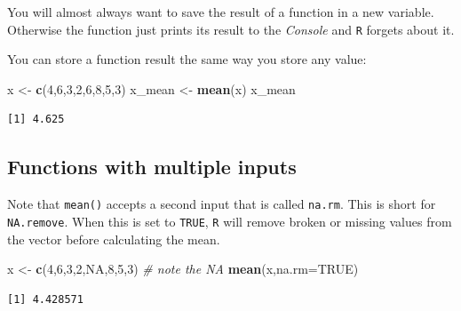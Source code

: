 \documentclass[
]{book}
\newenvironment{Shaded}{\begin{snugshade}}{\end{snugshade}}
\newcommand{\CommentTok}[1]{\textcolor[rgb]{0.56,0.35,0.01}{\textit{#1}}}
\newcommand{\DataTypeTok}[1]{\textcolor[rgb]{0.13,0.29,0.53}{#1}}
\newcommand{\DecValTok}[1]{\textcolor[rgb]{0.00,0.00,0.81}{#1}}
\newcommand{\KeywordTok}[1]{\textcolor[rgb]{0.13,0.29,0.53}{\textbf{#1}}}
\newcommand{\NormalTok}[1]{#1}
\newcommand{\OtherTok}[1]{\textcolor[rgb]{0.56,0.35,0.01}{#1}}
\newcommand{\StringTok}[1]{\textcolor[rgb]{0.31,0.60,0.02}{#1}}
\begin{document}
You will almost always want to save the result of a function in a new variable. Otherwise the function just prints its result to the \emph{Console} and \texttt{R} forgets about it.

You can store a function result the same way you store any value:

\begin{Shaded}
\begin{Highlighting}[]
\NormalTok{x <-}\StringTok{ }\KeywordTok{c}\NormalTok{(}\DecValTok{4}\NormalTok{,}\DecValTok{6}\NormalTok{,}\DecValTok{3}\NormalTok{,}\DecValTok{2}\NormalTok{,}\DecValTok{6}\NormalTok{,}\DecValTok{8}\NormalTok{,}\DecValTok{5}\NormalTok{,}\DecValTok{3}\NormalTok{) }
\NormalTok{x_mean <-}\StringTok{ }\KeywordTok{mean}\NormalTok{(x) }
\NormalTok{x_mean}
\end{Highlighting}
\end{Shaded}

\begin{verbatim}
[1] 4.625
\end{verbatim}

\hypertarget{functions-with-multiple-inputs}{%
\subsection*{Functions with multiple inputs}\label{functions-with-multiple-inputs}}

Note that \texttt{mean()} accepts a second input that is called \texttt{na.rm}. This is short for \texttt{NA.remove}. When this is set to \texttt{TRUE}, \texttt{R} will remove broken or missing values from the vector before calculating the mean.

\begin{Shaded}
\begin{Highlighting}[]
\NormalTok{x <-}\StringTok{ }\KeywordTok{c}\NormalTok{(}\DecValTok{4}\NormalTok{,}\DecValTok{6}\NormalTok{,}\DecValTok{3}\NormalTok{,}\DecValTok{2}\NormalTok{,}\OtherTok{NA}\NormalTok{,}\DecValTok{8}\NormalTok{,}\DecValTok{5}\NormalTok{,}\DecValTok{3}\NormalTok{)  }\CommentTok{# note the NA}
\KeywordTok{mean}\NormalTok{(x,}\DataTypeTok{na.rm=}\OtherTok{TRUE}\NormalTok{)}
\end{Highlighting}
\end{Shaded}

\begin{verbatim}
[1] 4.428571
\end{verbatim}
\end{document}
